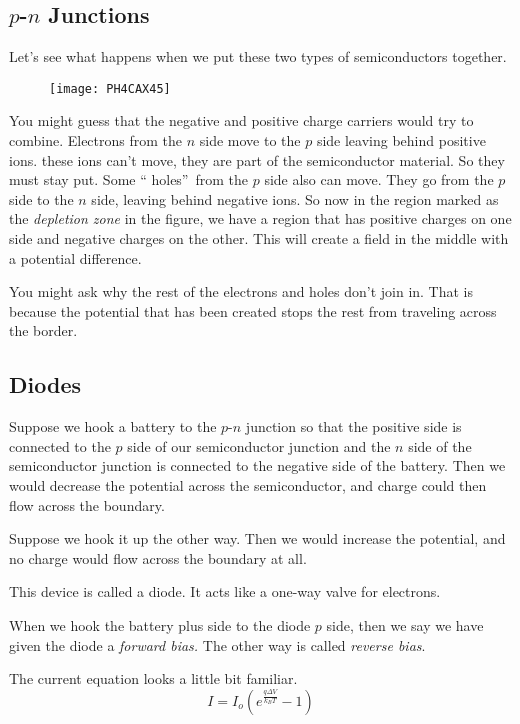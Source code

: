 \subsection{$p$-$n$ Junctions}

Let's see what happens when we put these two types of semiconductors
together. \begin{figure}[h!]
\texttt{[image: PH4CAX45]}
\end{figure}

You might guess that the negative and positive charge carriers would try to
combine. Electrons from the $n$ side move to the $p$ side leaving behind
positive ions. these ions can't move, they are part of the semiconductor
material. So they must stay put. Some \textquotedblleft
holes\textquotedblright\ from the $p$ side also can move. They go from the $%
p $ side to the $n$ side, leaving behind negative ions. So now in the region
marked as the \emph{depletion zone} in the figure, we have a region that has
positive charges on one side and negative charges on the other. This will
create a field in the middle with a potential difference.

You might ask why the rest of the electrons and holes don't join in. That is
because the potential that has been created stops the rest from traveling
across the border.

\subsection{Diodes}

Suppose we hook a battery to the $p$-$n$ junction so that the positive side
is connected to the $p$ side of our semiconductor junction and the $n$ side
of the semiconductor junction is connected to the negative side of the
battery. Then we would decrease the potential across the semiconductor, and
charge could then flow across the boundary.

Suppose we hook it up the other way. Then we would increase the potential,
and no charge would flow across the boundary at all.

This device is called a diode. It acts like a one-way valve for electrons.

When we hook the battery plus side to the diode $p$ side, then we say we
have given the diode a \emph{forward bias.} The other way is called \emph{%
reverse bias}.

The current equation looks a little bit familiar.%
\begin{equation*}
I=I_{o}\left( e^{\frac{q\Delta V}{k_{B}T}}-1\right)
\end{equation*}%
$\allowbreak $

